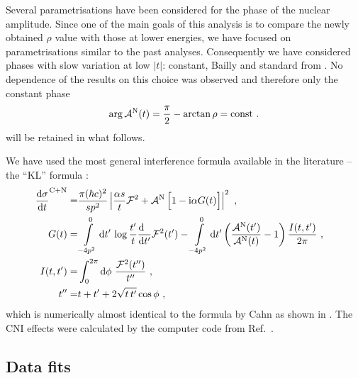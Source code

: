 Several parametrisations have been considered for the phase of the nuclear amplitude. Since one of the main goals of this analysis is to compare the newly obtained $\rho$ value with those at lower energies, we have focused on parametrisations similar to the past analyses. Consequently we have considered phases with slow variation at low $|t|$: constant, Bailly and standard from \cite{totem-8tev-1km}. No dependence of the results on this choice was observed and therefore only the constant phase
\begin{equation}
\label{eq:nuc phase con}
\arg {\cal A}^{\rm N}(t) = {\pi\over 2} - \arctan\rho = \hbox{const} \ .
\end{equation}
will be retained in what follows. 

We have used the most general interference formula available in the literature -- the ``KL'' formula \cite{kl94}:
\begin{equation}
\label{eq:int kl}
	\begin{aligned}
		{\d\sigma\over \d t}^{\rm C+N} =& {\pi (\hbar c)^2 \over s p^2} \left | {\alpha s\over t} {\cal F}^2
			+ {\cal A}^{\rm N}\, \Big[1 - \I\alpha G(t)\Big] \right |^2\ ,\cr
		G(t) =& \int\limits_{-4p^2}^0 \d t'\, \log {t'\over t} {\d\phantom{t'}\over \d t'} {\cal F}^2(t')
			  - \int\limits_{-4p^2}^0 \d t' \left( {{\cal A}^{\rm N}(t') \over {\cal A}^{\rm N}(t)} - 1 \right) { I(t, t')\over 2\pi }\ , \cr
		I(t, t') =& \int_0^{2\pi} \d\phi\ {{\cal F}^2(t'')\over t''}\ ,\cr
		t'' =& t + t' + 2\sqrt{t\, t'} \cos\phi\ ,\cr
	\end{aligned}
\end{equation}
which is numerically almost identical to the formula by Cahn \cite{cahn82} as shown in \cite{totem-8tev-1km}. The CNI effects were calculated by the computer code from Ref.~\cite{elegent}.


\subsection{Data fits}
\label{sec:rho anal}

